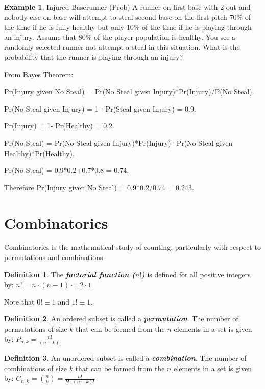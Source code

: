 \documentclass[
  11pt,
]{book}
\theoremstyle{definition}
\newtheorem{definition}{Definition}[chapter]
\theoremstyle{definition}
\newtheorem{example}{Example}[chapter]
\theoremstyle{definition}
\theoremstyle{definition}
\theoremstyle{remark}
\begin{document}
\newpage

\begin{example}
Injured Baserunner (Prob)
A runner on first base with 2 out and nobody else on base will attempt to steal second base on the first pitch 70\% of the time if he is fully healthy but only 10\% of the time if he is playing through an injury. Assume that 80\% of the player population is healthy. You see a randomly selected runner not attempt a steal in this situation. What is the probability that the runner is playing through an injury?
\end{example}

From Bayes Theorem:

Pr(Injury given No Steal) = Pr(No Steal given Injury)*Pr(Injury)/P(No Steal).

Pr(No Steal given Injury) = 1 - Pr(Steal given Injury) = 0.9.

Pr(Injury) = 1- Pr(Healthy) = 0.2.

Pr(No Steal) = Pr(No Steal given Injury)*Pr(Injury)+Pr(No Steal given Healthy)*Pr(Healthy).

Pr(No Steal) = 0.9*0.2+0.7*0.8 = 0.74.

Therefore Pr(Injury given No Steal) = 0.9*0.2/0.74 = 0.243.

\newpage

\hypertarget{combinatorics}{%
\section{Combinatorics}\label{combinatorics}}

Combinatorics is the mathematical study of counting, particularly with respect to permutations and combinations.

\begin{definition}
The \textbf{\emph{factorial function (\(n!\))}} is defined for all positive integers by: \(n! = n \cdot (n-1) \cdot \ldots 2 \cdot 1\)
\end{definition}

Note that \(0! \equiv 1\) and \(1! \equiv 1\).

\begin{definition}
An ordered subset is called a \textbf{\emph{permutation}}. The number of permutations of size \(k\) that can be formed from the \(n\) elements in a set is given by: \(P_{n,k} = \frac{n!}{(n-k)!}\)
\end{definition}

\begin{definition}
An unordered subset is called a \textbf{\emph{combination}}. The number of combinations of size \(k\) that can be formed from the \(n\) elements in a set is given by: \(C_{n,k} = {n \choose k} = \frac{n!}{k! \cdot (n-k)!}\)
\end{definition}
\end{document}
